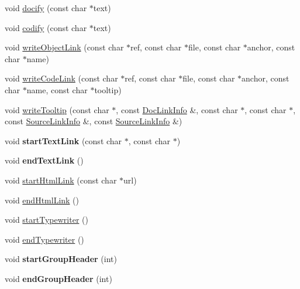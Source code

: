 \begin{DoxyCompactItemize}
\item 
void \hyperlink{class_man_generator_ab9d90b3c6f2e1105a2fe6ce2a1486f75}{docify} (const char $\ast$text)
\item 
void \hyperlink{class_man_generator_a96b26b0cb63719fd5370a9a04d2ebb38}{codify} (const char $\ast$text)
\item 
void \hyperlink{class_man_generator_a78d7e4718290246f77043de949c83081}{write\-Object\-Link} (const char $\ast$ref, const char $\ast$file, const char $\ast$anchor, const char $\ast$name)
\item 
void \hyperlink{class_man_generator_ab3866da052a840c400b4990dd2ddf61b}{write\-Code\-Link} (const char $\ast$ref, const char $\ast$file, const char $\ast$anchor, const char $\ast$name, const char $\ast$tooltip)
\item 
void \hyperlink{class_man_generator_a7ff5de02f14ba4c6b98edcaa3483e386}{write\-Tooltip} (const char $\ast$, const \hyperlink{struct_doc_link_info}{Doc\-Link\-Info} \&, const char $\ast$, const char $\ast$, const \hyperlink{struct_source_link_info}{Source\-Link\-Info} \&, const \hyperlink{struct_source_link_info}{Source\-Link\-Info} \&)
\item 
\hypertarget{class_man_generator_aa1b23d9bacbb6cb75e204111a9f4484c}{void {\bfseries start\-Text\-Link} (const char $\ast$, const char $\ast$)}\label{class_man_generator_aa1b23d9bacbb6cb75e204111a9f4484c}

\item 
\hypertarget{class_man_generator_a98515ca43c32f8bc616925eb3c683b6e}{void {\bfseries end\-Text\-Link} ()}\label{class_man_generator_a98515ca43c32f8bc616925eb3c683b6e}

\item 
void \hyperlink{class_man_generator_a0746b9c06743e1d4fe527b8317457da1}{start\-Html\-Link} (const char $\ast$url)
\item 
void \hyperlink{class_man_generator_ac2ba450d319270e186e436167c8609ce}{end\-Html\-Link} ()
\item 
void \hyperlink{class_man_generator_a2e60bda5e249554e2fc264aa32d9d93e}{start\-Typewriter} ()
\item 
void \hyperlink{class_man_generator_acb220673316232acd7d1050553dafaf6}{end\-Typewriter} ()
\item 
\hypertarget{class_man_generator_ac9eee86f35f465f0160ccea844c3b80d}{void {\bfseries start\-Group\-Header} (int)}\label{class_man_generator_ac9eee86f35f465f0160ccea844c3b80d}

\item 
\hypertarget{class_man_generator_ae267a69e7fa49c697d1cdce247d81b38}{void {\bfseries end\-Group\-Header} (int)}\label{class_man_generator_ae267a69e7fa49c697d1cdce247d81b38}


\end{DoxyCompactItemize}

